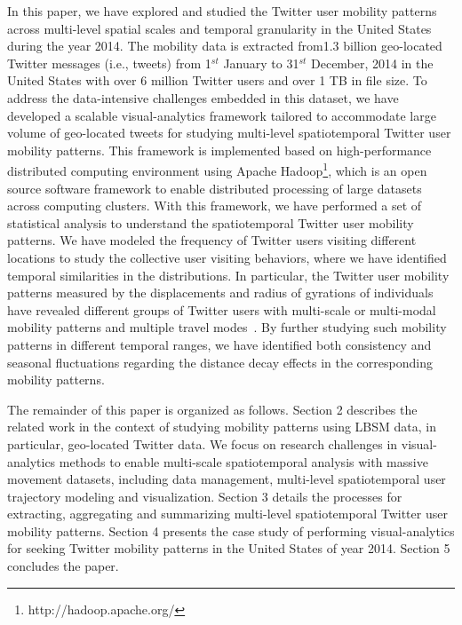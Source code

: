 \documentclass[ijgi,article,submit,moreauthors,pdftex,10pt,a4paper]{mdpi}
\theoremstyle{mdpi}
\newcounter{thm}
\newcounter{ex}
\newcounter{re}
\theoremstyle{mdpidefinition}
\begin{document}
In this paper, we have explored and studied the Twitter user mobility patterns across multi-level spatial scales and temporal granularity in the United States during the year 2014. 
The mobility data is extracted from1.3 billion geo-located Twitter messages (i.e., tweets) from 1$^{st}$ January to 31$^{st}$ December, 2014 in the United States with over 6 million Twitter users and over 1 TB in file size. 
To address the data-intensive challenges embedded in this dataset, we have developed a scalable visual-analytics framework tailored to accommodate large volume of geo-located tweets for studying multi-level spatiotemporal Twitter user mobility patterns.
This framework is implemented based on high-performance distributed computing environment using Apache Hadoop\footnote{http://hadoop.apache.org/}, which is an open source software framework to enable distributed processing of large datasets across computing clusters.
With this framework, we have performed a set of statistical analysis to understand the spatiotemporal Twitter user mobility patterns. 
We have modeled the frequency of Twitter users visiting different locations to study the collective user visiting behaviors, where we have identified temporal similarities in the distributions. 
In particular, the Twitter user mobility patterns measured by the displacements and radius of gyrations of individuals~\cite{gonzalez2008understanding} have revealed different groups of Twitter users with multi-scale or multi-modal mobility patterns and multiple travel modes~\cite{Jurdak2015}.
By further studying such mobility patterns in different temporal ranges, we have identified both consistency and seasonal fluctuations regarding the distance decay effects in the corresponding mobility patterns. 

The remainder of this paper is organized as follows.
Section 2 describes the related work in the context of studying mobility patterns using LBSM data, in particular, geo-located Twitter data.
We focus on research challenges in visual-analytics methods to enable multi-scale
spatiotemporal analysis with massive movement datasets, including data management, multi-level spatiotemporal user trajectory modeling and visualization.
Section 3 details the processes for extracting, aggregating and summarizing multi-level spatiotemporal Twitter user mobility patterns.
Section 4 presents the case study of performing visual-analytics for seeking Twitter mobility patterns in the United States of year 2014. Section 5 concludes the paper.
\end{document}
